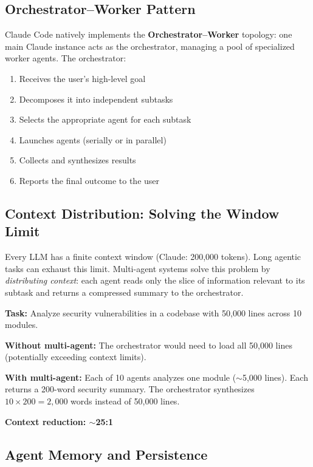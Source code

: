 \documentclass[11pt,letterpaper]{article}
\begin{document}
\subsection{Orchestrator--Worker Pattern}

Claude Code natively implements the \textbf{Orchestrator--Worker} topology: one main Claude instance acts as the orchestrator, managing a pool of specialized worker agents. The orchestrator:

\begin{enumerate}[leftmargin=*]
    \item Receives the user's high-level goal
    \item Decomposes it into independent subtasks
    \item Selects the appropriate agent for each subtask
    \item Launches agents (serially or in parallel)
    \item Collects and synthesizes results
    \item Reports the final outcome to the user
\end{enumerate}

\subsection{Context Distribution: Solving the Window Limit}

Every LLM has a finite context window (Claude: 200,000 tokens). Long agentic tasks can exhaust this limit. Multi-agent systems solve this problem by \emph{distributing context}: each agent reads only the slice of information relevant to its subtask and returns a compressed summary to the orchestrator.

\begin{examplebox}[title=Context Distribution in Practice]
\textbf{Task:} Analyze security vulnerabilities in a codebase with 50,000 lines across 10 modules.

\textbf{Without multi-agent:} The orchestrator would need to load all 50,000 lines (potentially exceeding context limits).

\textbf{With multi-agent:} Each of 10 agents analyzes one module ($\sim$5,000 lines). Each returns a 200-word security summary. The orchestrator synthesizes $10 \times 200 = 2,000$ words instead of 50,000 lines.

\textbf{Context reduction: $\sim$25:1}
\end{examplebox}

\subsection{Agent Memory and Persistence}
\end{document}
